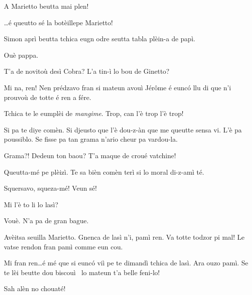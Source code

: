 \begin{drama}
\Mariettospeaks A Marietto beutta mai plen!

\Simonspeaks \ldots é queutto sé la botèille\wine pe Marietto!

\Cienspeaks Simon aprì beutta tchica eugn odre seutta tabla plèin-a de papì.

\Simonspeaks Ouè pappa.


\Mariettospeaks {} T’a de novitoù desì Cobra? L’a tin-ì lo bou de Ginetto?

\Cienspeaks Mi na, ren! Nen prédzavo fran si mateun avouì Jérôme é eunc\'o llu di que n’i prouvoù de totte é ren a fére.

\Mariettospeaks Tchica te le eumplèi de \textit{mangime}. Trop, can l’è trop l’è trop!

\Cienspeaks Si pa te diye comèn. Si djeusto que l’è dou-z-àn que me queutte sensa vi. L’è pa poussiblo. Se fisse pa tan grama n’ario cheur pa vardou-la.

\Mariettospeaks Grama?! Dedeun ton baou? T’a maque de croué va\-tchine!

\Cienspeaks {} Queutta-mé pe plèizì. Te sa bièn comèn terì si lo moral di-z-amì té.

\Mariettospeaks Squersavo, squeza-mé! Veun sé!




\Cienspeaks Mi l’è to li lo lasì?

\Sahlammspeaks Vouè. N’a pa de gran bague.

\Cienspeaks Avèitsa seuilla Marietto. Gnenca de lasì n’i, pamì ren. Va totte todzor pi mal! Le vatse rendon fran pamì comme eun cou.


\Mariettospeaks Mi fran ren\ldots é mé que si eunc\'o viì pe te dimandì tchica de lasì. Ara ouzo pamì. Se te lèi beutte dou biscouì \biscotto\ lo mateun t’a belle feni-lo!


\Mariettospeaks Sah alèn no chouaté!


\end{drama}
